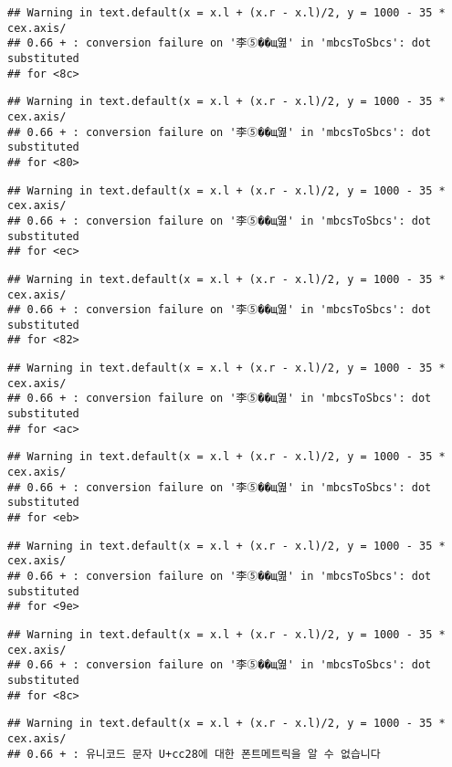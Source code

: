 \documentclass[]{article}
\begin{document}
\begin{verbatim}
## Warning in text.default(x = x.l + (x.r - x.l)/2, y = 1000 - 35 * cex.axis/
## 0.66 + : conversion failure on '李⑤��щ엺' in 'mbcsToSbcs': dot substituted
## for <8c>
\end{verbatim}

\begin{verbatim}
## Warning in text.default(x = x.l + (x.r - x.l)/2, y = 1000 - 35 * cex.axis/
## 0.66 + : conversion failure on '李⑤��щ엺' in 'mbcsToSbcs': dot substituted
## for <80>
\end{verbatim}

\begin{verbatim}
## Warning in text.default(x = x.l + (x.r - x.l)/2, y = 1000 - 35 * cex.axis/
## 0.66 + : conversion failure on '李⑤��щ엺' in 'mbcsToSbcs': dot substituted
## for <ec>
\end{verbatim}

\begin{verbatim}
## Warning in text.default(x = x.l + (x.r - x.l)/2, y = 1000 - 35 * cex.axis/
## 0.66 + : conversion failure on '李⑤��щ엺' in 'mbcsToSbcs': dot substituted
## for <82>
\end{verbatim}

\begin{verbatim}
## Warning in text.default(x = x.l + (x.r - x.l)/2, y = 1000 - 35 * cex.axis/
## 0.66 + : conversion failure on '李⑤��щ엺' in 'mbcsToSbcs': dot substituted
## for <ac>
\end{verbatim}

\begin{verbatim}
## Warning in text.default(x = x.l + (x.r - x.l)/2, y = 1000 - 35 * cex.axis/
## 0.66 + : conversion failure on '李⑤��щ엺' in 'mbcsToSbcs': dot substituted
## for <eb>
\end{verbatim}

\begin{verbatim}
## Warning in text.default(x = x.l + (x.r - x.l)/2, y = 1000 - 35 * cex.axis/
## 0.66 + : conversion failure on '李⑤��щ엺' in 'mbcsToSbcs': dot substituted
## for <9e>
\end{verbatim}

\begin{verbatim}
## Warning in text.default(x = x.l + (x.r - x.l)/2, y = 1000 - 35 * cex.axis/
## 0.66 + : conversion failure on '李⑤��щ엺' in 'mbcsToSbcs': dot substituted
## for <8c>
\end{verbatim}

\begin{verbatim}
## Warning in text.default(x = x.l + (x.r - x.l)/2, y = 1000 - 35 * cex.axis/
## 0.66 + : 유니코드 문자 U+cc28에 대한 폰트메트릭을 알 수 없습니다
\end{verbatim}
\end{document}
